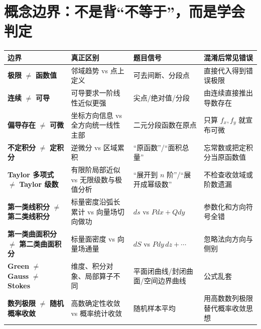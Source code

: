 \documentclass[11pt,a4paper,openany]{ctexbook}
\newcommand{\key}[1]{\textbf{\color{deep}#1}}\newcommand{\eng}[1]{\textit{#1}}\let\cleardoublepage\clearpage
\begin{document}
\chapter{概念边界：不是背“不等于”，而是学会判定}
\begin{longtable}{L{3.4cm}L{4.7cm}L{4.0cm}L{\dimexpr\linewidth-12.97cm\relax}}
\toprule\textbf{边界}&\textbf{真正区别}&\textbf{题目信号}&\textbf{混淆后常见错误}\\\midrule
\key{极限} $\neq$ \key{函数值} & 邻域趋势 vs 点上定义 & 可去间断、分段点 & 直接代入得到错误极限\\
\midrule
\key{连续} $\neq$ \key{可导} & 可导要求一阶线性近似更强 & 尖点/绝对值/分段 & 由连续直接推出导数存在\\
\midrule
\key{偏导存在} $\neq$ \key{可微} & 坐标方向信息 vs 全方向统一线性主部 & 二元分段函数在原点 & 只算 $f_x,f_y$ 就宣布可微\\
\midrule
\key{不定积分} $\neq$ \key{定积分} & 逆微分 vs 区域累积 & “原函数”/“面积总量” & 忘常数或把定积分当原函数值\\
\midrule
\key{Taylor 多项式} $\neq$ \key{Taylor 级数} & 有限阶局部近似 vs 无限级数与极值分析 & “展开到 $n$ 阶”/“展开成幂级数” & 不检查收敛域或阶数遗漏\\
\midrule
\key{第一类线积分} $\neq$ \key{第二类线积分} & 标量密度沿弧长累计 vs 向量场切向做功 & $ds$ vs $Pdx+Qdy$ & 参数化和方向符号全错\\
\midrule
\key{第一类曲面积分} $\neq$ \key{第二类曲面积分} & 标量面密度 vs 向量场通量 & $dS$ vs $Pdy\,dz+\cdots$ & 忽略法向方向与侧别\\
\midrule
\key{Green} $\neq$ \key{Gauss} $\neq$ \key{Stokes} & 维度、积分对象、局部算子不同 & 平面闭曲线/封闭曲面/空间边界曲线 & 公式乱套\\
\midrule
\key{数列极限} $\neq$ \key{随机概率收敛} & 高数确定性收敛 vs 概率统计收敛 & 随机样本平均 & 用高数数列极限替代概率收敛思想\\
\bottomrule\end{longtable}
\end{document}
